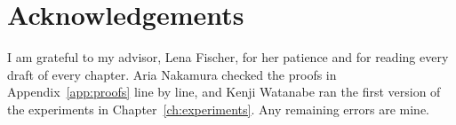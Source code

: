 \chapter*{Acknowledgements}

I am grateful to my advisor, Lena Fischer, for her patience and for reading every draft of every chapter. Aria Nakamura checked the proofs in Appendix~\ref{app:proofs} line by line, and Kenji Watanabe ran the first version of the experiments in Chapter~\ref{ch:experiments}. Any remaining errors are mine.
